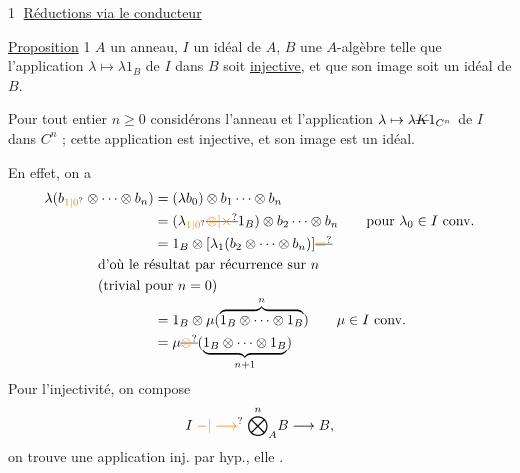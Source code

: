 \textcircled{1} \uline{Réductions via le conducteur}

\uline{Proposition} 1 \quad $A$ un anneau, $I$ un idéal de $A$, $B$ une $A$-algèbre  telle que l'application $\lambda\mapsto\lambda 1_B$ de $I$ dans $B$ soit \uline{injective}, et que son image soit  un idéal de $B$. 

Pour tout entier $n\geq 0$ considérons l'anneau  et l'application $\lambda\mapsto\lambda\deleted{K}1_{C^{n}}$ de $I$ dans $C^{n}$ ;  cette application est injective, et son image est un idéal. 

En effet, on a
\[
\begin{aligned}
\lambda(b_{\unsure{1|0}}\otimes\cdots\otimes b_n)&=(\lambda b_0)\otimes b_1\cdots\otimes b_n\\
&=(\lambda_{\unsure{1|0}}\deleted{\unsure{\otimes|\times}}1_B)\otimes b_2\cdots\otimes b_n
  \qquad\text{pour }\lambda_0\in I\ \text{conv.}\\
&=1_B\otimes[\lambda_1(b_2\otimes\cdots\otimes b_n)]\deleted{\unsure{=}}\\
&\hspace{-4em}\text{d'où le résultat par récurrence sur }n\\
&\hspace{-4em}\text{(trivial pour }n=0\text{)}\\[-.6ex]
&=1_B\otimes\mu(\overbrace{1_B\otimes\cdots\otimes1_B}^{n})
  \qquad\mu\in I\ \text{conv.}\\
&=\mu\deleted{\unsure{\otimes}}(\underbrace{1_B\otimes\cdots\otimes1_B}_{n+1})
\end{aligned}
\]
Pour l'injectivité, on compose
\[
I\mathrel{\unsure{-|\longrightarrow}}\overset n{\bigotimes}_A B\longrightarrow B,
\]
on trouve une application inj. par hyp., elle  .

